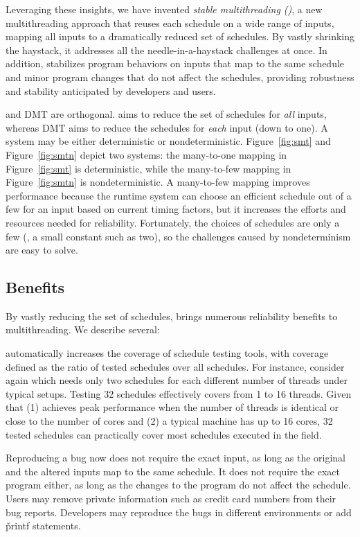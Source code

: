Leveraging these insights, we have invented \emph{stable multithreading
  (\smt)}, a new multithreading approach that reuses each schedule on a wide
range of inputs, mapping all inputs to a dramatically reduced set of schedules.
By vastly shrinking the haystack, it addresses all the needle-in-a-haystack
challenges at once.  In addition, \smt stabilizes program behaviors
on inputs that map to the same schedule and minor program changes that
do not affect the schedules, providing robustness and stability
anticipated by developers and users.

\smt and DMT are orthogonal. \smt aims to reduce the set of schedules for
\emph{all} inputs, whereas DMT aims to reduce the schedules for \emph{each} input (down
to one).  A \smt system may be either deterministic or nondeterministic.
Figure~\ref{fig:smt} and Figure~\ref{fig:smtn} depict two \smt systems: the
many-to-one mapping in Figure~\ref{fig:smt} is deterministic, while the
many-to-few mapping in Figure~\ref{fig:smtn} is nondeterministic.  A
many-to-few mapping improves performance because the
runtime system can choose an efficient schedule out of a few for an input
based on current timing factors, but it increases the efforts and
resources needed for reliability.  Fortunately, the choices of schedules
are only a few (\eg, a small constant such as two), so the challenges
caused by nondeterminism are easy to solve.

\subsection{Benefits}

By vastly reducing the set of schedules, \smt brings numerous reliability benefits
to multithreading.  We describe several:

 \smt automatically
increases the coverage of schedule testing tools, with coverage
defined as the ratio of tested schedules over all schedules.
For instance, consider \pbzip again which needs only two
schedules for each different number of threads under typical setups.  Testing 32 schedules effectively covers from
1 to 16 threads.  Given that (1) \pbzip achieves peak performance when the
number of threads is identical or close to the number of cores
and (2) a typical machine has up to 16 cores, 32 tested schedules can
practically cover most schedules executed in the field.

 Reproducing a bug now does not require the exact input,
as long as the original and the altered inputs map to the same schedule.
It does not require the exact program either, as long as the changes to
the program do not affect the schedule.  Users may remove private
information such as credit card numbers from their bug reports. Developers
may reproduce the bugs in different environments or add \v{printf}
statements.

